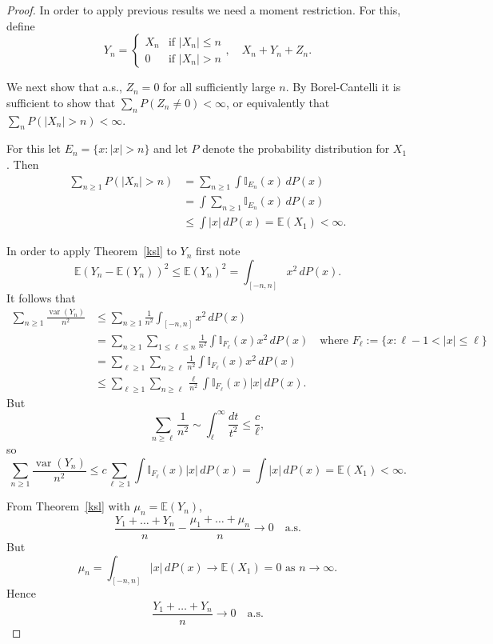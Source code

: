 \documentclass[a4paper]{amsart}
\theoremstyle{plain}
\theoremstyle{definition}
\theoremstyle{remark}
\DeclareMathOperator{\var}{var}
\begin{document}
\begin{proof} In order to apply previous results we need a moment restriction.  For this, define
\[
Y_n = \begin{cases} X_n &\text{if } |X_n|\leq n \\
                                     0 &\text{if } |X_n |> n
           \end{cases}, \quad X_n + Y_n + Z_n.
\]

\medskip We next show that a.s.,  $ Z_n = 0 $ for all sufficiently large $ n $. By Borel-Cantelli it is sufficient to show that 
$ \sum_n P(Z_n \neq 0) < \infty $, or equivalently that $ \sum_n P(|X_n|>n ) < \infty $.

For this let $ E_n = \{ x : |x|> n \} $ and let $ P $ denote the probability distribution for $ X_1 $.  Then
\begin{align*} 
 \sum_{n\geq 1} P(|X_n|>n ) &=  \sum_{n\geq 1} \int \mathbb{I}_{E_n} (x) \, dP(x) \\
     &= \int \sum_{n\geq 1}  \mathbb{I}_{E_n} (x) \, dP(x) \\
     &\leq \int |x|\, dP(x) = \mathbb{E} (X_1) < \infty.
     \end{align*} 

\medskip  In order to apply Theorem~\ref{ksl} to $ Y_n $ first note
\[
\mathbb{E} (Y_n - \mathbb{E} (Y_n))^2 \leq \mathbb{E} (Y_n)^2 = \int_{[-n,n]}x^2 \, dP(x).
\]
It follows that
\begin{align*}
\sum_{n\geq 1} \frac{\var(Y_n)}{n^2} &\leq \sum_{n\geq 1} \frac{1}{n^2}\int_{[-n,n]}x^2 \, dP(x) \\
         &= \sum_{n\geq 1} \sum_{1\leq \ell \leq n}  \frac{1}{n^2}\int \mathbb{I}_{F_\ell} (x) x^2 \, dP(x) \quad \text{where } F_\ell := \{ x : \ell-1 < |x|\leq \ell \} \\
         &= \sum_{\ell \geq 1} \sum_{n \geq \ell} \frac{1}{n^2} \int  \mathbb{I}_{F_\ell} (x) x^2 \, dP(x) \\
         &\leq \sum_{\ell \geq 1} \sum_{n \geq \ell} \frac{\ell}{n^2} \int  \mathbb{I}_{F_\ell} (x) |x| \, dP(x) .
\end{align*} 
But
\[ 
 \sum_{n \geq \ell} \frac{1}{n^2} \sim \int _\ell ^\infty \frac{dt}{t^2} \leq \frac{c}{\ell},
\]
so
\[
\sum_{n\geq 1} \frac{\var(Y_n)}{n^2}  \leq  c \sum_{\ell \geq 1}  \int  \mathbb{I}_{F_\ell} (x) |x| \, dP(x) = \int   |x| \, dP(x) = \mathbb{E} (X_1) < \infty .
\]

From Theorem~\ref{ksl} with $ \mu_n = \mathbb{E} (Y_n) $, 
\[
\frac{Y_1+\dots+Y_n}{n} - \frac{\mu_1 + \dots + \mu_n}{n} \to 0 \quad \text{a.s.}
\]
But 
\[
 \mu_n = \int_{[-n,n]} |x|\, dP(x) \to \mathbb{E} (X_1) = 0 \text{ as } n \to \infty.
\]
Hence
\[
\frac{Y_1+\dots+Y_n}{n}  \to 0 \quad \text{a.s.}
\]
 

\end{proof}
\end{document}
